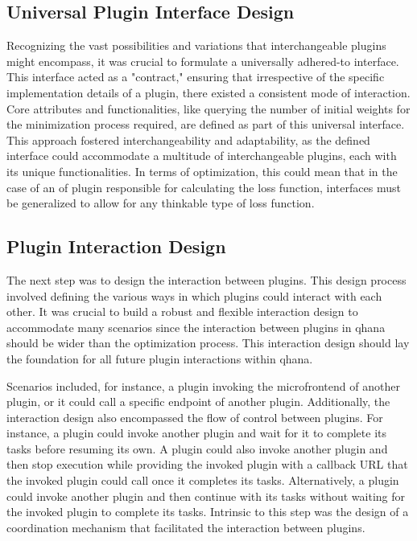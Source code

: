 \documentclass[
  a4paper,  %
  twoside,  %
  bibliography=totoc,
  headsepline,
  cleardoublepage=empty,
  parskip=half,
  draft=false
]{scrbook}
\begin{document}
\subsection{Universal Plugin Interface Design}
Recognizing the vast possibilities and variations that interchangeable plugins might encompass, it was crucial to formulate a universally adhered-to interface.
This interface acted as a "contract," ensuring that irrespective of the specific implementation details of a plugin, there existed a consistent mode of interaction.
Core attributes and functionalities, like querying the number of initial weights for the minimization process required, are defined as part of this universal interface.
This approach fostered interchangeability and adaptability, as the defined interface could accommodate a multitude of interchangeable plugins, each with its unique functionalities.
In terms of optimization, this could mean that in the case of an \gls{of} plugin responsible for calculating the loss function, interfaces must be generalized to allow for any thinkable type of loss function.


\subsection{Plugin Interaction Design}
The next step was to design the interaction between plugins.
This design process involved defining the various ways in which plugins could interact with each other.
It was crucial to build a robust and flexible interaction design to accommodate many scenarios since the interaction between plugins in \gls{qhana} should be wider than the optimization process.
This interaction design should lay the foundation for all future plugin interactions within \gls{qhana}.

Scenarios included, for instance, a plugin invoking the microfrontend of another plugin, or it could call a specific endpoint of another plugin.
Additionally, the interaction design also encompassed the flow of control between plugins.
For instance, a plugin could invoke another plugin and wait for it to complete its tasks before resuming its own.
A plugin could also invoke another plugin and then stop execution while providing the invoked plugin with a callback URL that the invoked plugin could call once it completes its tasks.
Alternatively, a plugin could invoke another plugin and then continue with its tasks without waiting for the invoked plugin to complete its tasks.
Intrinsic to this step was the design of a coordination mechanism that facilitated the interaction between plugins.
\end{document}
